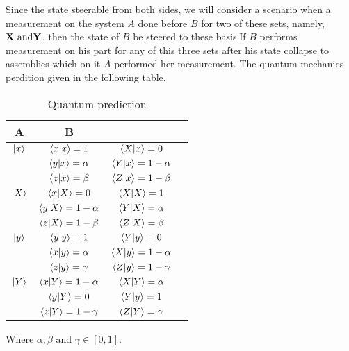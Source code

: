 Since the state steerable from both sides, we will consider a scenario when a measurement on the system $A$ done before $B$ for two of these sets, namely, $\bf{X} \text{ and} \bf{Y} $, then the state of $B$ be steered to these basis.If $B$ performs measurement on his part for any of this three sets after his state collapse to assemblies which on it $A$ performed her measurement.
The quantum mechanics perdition given in the following table.


\begin {table}[H]
\begin{center}\label{tabal1}
\begin{tabular}{ |c | c c| c|}    
\hline
A&B\\
\hline
$\ket{x}$&$\bra{x}\ket{x} = 1$&$\bra{X}\ket{x} = 0$\\
\hline
&$\bra{y}\ket{x} = \alpha$&$\bra{Y}\ket{x} = 1-\alpha$\\
\hline
&$\bra{z}\ket{x} = \beta$&$\bra{Z}\ket{x} =  1-\beta$\\
\hline
$\ket{X}$&$\bra{x}\ket{X} = 0$&$\bra{X}\ket{X} = 1$\\
\hline
&$\bra{y}\ket{X} =1-\alpha$&$\bra{Y}\ket{X} = \alpha$\\
\hline
&$\bra{z}\ket{X} = 1-\beta $&$\bra{Z}\ket{X} = \beta$\\
\hline
$\ket{y}$&$\bra{y}\ket{y} = 1$&$\bra{Y}\ket{y} = 0$\\
\hline
&$\bra{x}\ket{y} = \alpha$&$\bra{X}\ket{y} = 1-\alpha$\\
\hline
&$\bra{z}\ket{y} = \gamma$&$\bra{Z}\ket{y} = 1-\gamma$\\
\hline
$\ket{Y}$&$\bra{x}\ket{Y} = 1-\alpha$&$\bra{X}\ket{Y} = \alpha$\\
\hline
&$\bra{y}\ket{Y} = 0$&$\bra{Y}\ket{y} = 1$\\
\hline
&$\bra{z}\ket{Y}  = 1-\gamma$&$\bra{Z}\ket{Y} = \gamma$\\
\hline
\end{tabular}
\caption {Quantum prediction}
\label{table:3}
\end{center}
\end{table}
Where $\alpha, \beta \text{ and } \gamma \in [0,1]$.





